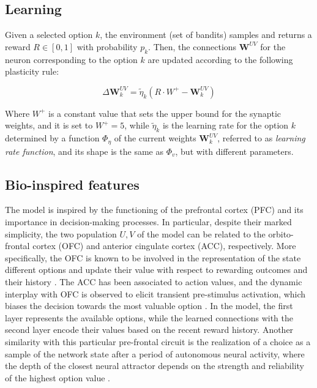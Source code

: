 \subsection{Learning}
Given a selected option $k$, the environment (set of bandits) samples and returns a reward $R\in [0, 1]$ with probability $p_{k}$.
Then, the connections $\textbf{W}^{UV}$ for the neuron corresponding to the option $k$ are updated according to the following plasticity rule:

\begin{equation}
    \Delta \textbf{W}^{UV}_{k} = \tilde{\eta}_{k} \left(R\cdot W^{+}- \textbf{W}^{UV}_{k}\right)
\end{equation}

\noindent
Where $W^{+}$ is a constant value that sets the upper bound for the synaptic weights, and it is set to $W^{+} = 5$, while $\tilde{\eta}_{k}$ is the learning rate for the option $k$ determined by a function $\Phi_{\eta}$ of the current weights $\textbf{W}^{UV}_{k}$, referred to as \textit{learning rate function}, and its shape is the same as $\Phi_{v}$, but with different parameters.


\subsection{Bio-inspired features}

The model is inspired by the functioning of the prefrontal cortex (PFC) and its importance in decision-making processes. In particular, despite their marked simplicity, the two population $U, V$ of the model can be related to the orbito-frontal cortex (OFC) and anterior cingulate cortex (ACC), respectively.
More specifically, the OFC is known to be involved in the representation of the state different options and update their value with respect to rewarding outcomes and their history \cite{lukChoiceCodingFrontal2013, kennerleyDecisionMakingReward2011a}. The ACC has been associated to action values, and the dynamic interplay with OFC is observed to elicit
transient pre-stimulus activation, which biases the decision towards the most valuable option \cite{funahashiPrefrontalContributionDecisionMaking2017, marcosDeterminingMonkeyFree2016, balewskiValueDynamicsAffect2023}. In the model, the first layer represents the available options, while the learned
connections with the second layer encode their values based on the recent reward history. Another similarity with this particular pre-frontal circuit is the realization of a choice as a sample of the network state after a period of autonomous neural activity, where the depth of the closest
neural attractor depends on the strength and reliability of the highest option value \cite{backmanEffectsWorkingMemoryTraining2011, enelStableDynamicRepresentations2020}.

